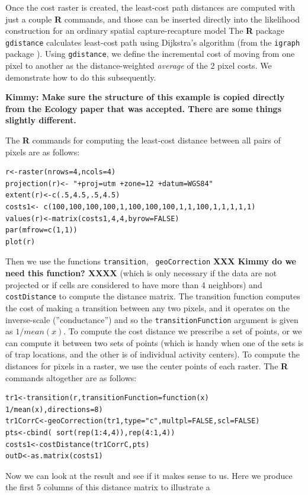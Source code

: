 Once the cost raster is created, the least-cost path distances are
computed with just a couple {\bf R} commands, and those can be
inserted directly into the likelihood construction for an ordinary
spatial capture-recapture model The {\bf R} package
\mbox{\tt gdistance} calculates least-cost path using  Dijkstra's algorithm
\citep{dijkstra:1959} (from the \mbox{\tt igraph} package
\citep{csardi:2010}).  Using \mbox{\tt gdistance}, we 
define the incremental cost of moving from one pixel to another as the
distance-weighted {\it average} of the 2 pixel costs. We demonstrate
how to do this subsequently.

{\bf Kimmy: Make sure the structure of this example is copied directly
from the Ecology paper that was accepted. There are some things
slightly
different.}

The {\bf R} commands for computing the least-cost distance between all pairs of pixels
are as follows:
\begin{verbatim}
r<-raster(nrows=4,ncols=4)
projection(r)<- "+proj=utm +zone=12 +datum=WGS84"
extent(r)<-c(.5,4.5,.5,4.5)
costs1<- c(100,100,100,100,1,100,100,100,1,1,100,1,1,1,1,1)
values(r)<-matrix(costs1,4,4,byrow=FALSE)
par(mfrow=c(1,1))
plot(r)
\end{verbatim}
Then we use the functions \mbox{\tt transition}, \mbox{\tt
  geoCorrection} {\bf XXX Kimmy do we need this function? XXXX}
 (which is only necessary if the data are not
projected or if cells are considered to have more than 4 neighbors)
 and \mbox{\tt costDistance} to compute the distance
matrix. The transition function computes the cost of making a
transition between
any two pixels, and it operates on the inverse-scale (''conductance'')
and so the
\mbox{\tt transitionFunction} argument is given as $1/mean(x)$.
To compute the cost distance we prescribe a set of points, or  we
can compute it  between
two sets of points (which is handy when one of the sets is of trap
locations, and the other is of individual activity centers).
To compute the distances for pixels in a raster,
we use the center points of each raster.  The {\bf R}
 commands altogether are as follows:
{\small
\begin{verbatim}
tr1<-transition(r,transitionFunction=function(x) 1/mean(x),directions=8)
tr1CorrC<-geoCorrection(tr1,type="c",multpl=FALSE,scl=FALSE)
pts<-cbind( sort(rep(1:4,4)),rep(4:1,4))
costs1<-costDistance(tr1CorrC,pts)
outD<-as.matrix(costs1)
\end{verbatim}
}
Now we can look at the result and see if it makes sense to us. Here we
produce the first 5 columns of this distance matrix to illustrate a
